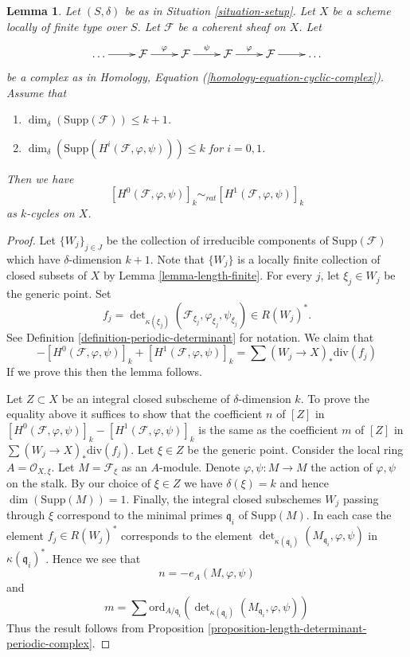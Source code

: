 \documentclass[10pt,a4paper]{amsart}
\theoremstyle{plain}
\newtheorem{lemma}[subsection]{Lemma}
\theoremstyle{definition}
\theoremstyle{remark}
\numberwithin{equation}{subsection}
\begin{document}
\begin{lemma}
\label{lemma-maps-between-coherent-sheaves}
Let $(S, \delta)$ be as in Situation \ref{situation-setup}.
Let $X$ be a scheme locally of finite type over $S$.
Let $\mathcal{F}$ be a coherent sheaf on $X$.
Let
$$
\xymatrix{
\ldots \ar[r] &
\mathcal{F} \ar[r]^\varphi &
\mathcal{F} \ar[r]^\psi &
\mathcal{F} \ar[r]^\varphi &
\mathcal{F} \ar[r] & \ldots
}
$$
be a complex as in Homology, Equation (\ref{homology-equation-cyclic-complex}).
Assume that
\begin{enumerate}
\item $\dim_\delta(\text{Supp}(\mathcal{F})) \leq k + 1$.
\item $\dim_\delta(\text{Supp}(H^i(\mathcal{F}, \varphi, \psi))) \leq k$
for $i = 0, 1$.
\end{enumerate}
Then we have
$$
[H^0(\mathcal{F}, \varphi, \psi)]_k
\sim_{rat}
[H^1(\mathcal{F}, \varphi, \psi)]_k
$$
as $k$-cycles on $X$.
\end{lemma}

\begin{proof}
Let $\{W_j\}_{j \in J}$ be the collection of irreducible
components of $\text{Supp}(\mathcal{F})$
which have $\delta$-dimension $k + 1$. Note that $\{W_j\}$
is a locally finite collection of closed subsets of
$X$ by Lemma \ref{lemma-length-finite}.
For every $j$, let $\xi_j \in W_j$ be the generic point.
Set
$$
f_j = \det\nolimits_{\kappa(\xi_j)}
(\mathcal{F}_{\xi_j}, \varphi_{\xi_j}, \psi_{\xi_j})
\in
R(W_j)^*.
$$
See Definition \ref{definition-periodic-determinant} for notation.
We claim that
$$
- [H^0(\mathcal{F}, \varphi, \psi)]_k + [H^1(\mathcal{F}, \varphi, \psi)]_k
=
\sum (W_j \to X)_*\text{div}(f_j)
$$
If we prove this then the lemma follows.

\medskip\noindent
Let $Z \subset X$ be an integral closed subscheme of $\delta$-dimension $k$.
To prove the equality above it suffices to show that the coefficient $n$
of $[Z]$ in
$
[H^0(\mathcal{F}, \varphi, \psi)]_k - [H^1(\mathcal{F}, \varphi, \psi)]_k
$
is the same as the coefficient $m$ of $[Z]$ in
$
\sum (W_j \to X)_*\text{div}(f_j)
$.
Let $\xi \in Z$ be the generic point.
Consider the local ring $A = \mathcal{O}_{X, \xi}$.
Let $M = \mathcal{F}_\xi$ as an $A$-module.
Denote $\varphi, \psi : M \to M$ the action of $\varphi, \psi$ on
the stalk.
By our choice of $\xi \in Z$ we have $\delta(\xi) = k$
and hence $\dim(\text{Supp}(M)) = 1$.
Finally, the integral closed subschemes
$W_j$ passing through $\xi$ correspond to the minimal primes
$\mathfrak q_i$ of $\text{Supp}(M)$.
In each case the element $f_j \in R(W_j)^*$ corresponds to
the element $\det_{\kappa(\mathfrak q_i)}(M_{\mathfrak q_i}, \varphi, \psi)$
in $\kappa(\mathfrak q_i)^*$. Hence we see that
$$
n = - e_A(M, \varphi, \psi)
$$
and
$$
m =
\sum
\text{ord}_{A/\mathfrak q_i}
(\det\nolimits_{\kappa(\mathfrak q_i)}(M_{\mathfrak q_i}, \varphi, \psi))
$$
Thus the result follows from
Proposition \ref{proposition-length-determinant-periodic-complex}.
\end{proof}
\end{document}
